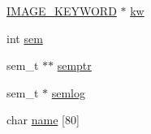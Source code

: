 \begin{DoxyCompactItemize}
\begin{tabbing}
\end{tabbing}\item 
\hyperlink{structIMAGE__KEYWORD}{I\+M\+A\+G\+E\+\_\+\+K\+E\+Y\+W\+O\+R\+D} $\ast$ \hyperlink{structIMAGE_aeec1ba7287c93dc589e38c4b1479b967}{kw}
\item 
int \hyperlink{structIMAGE_a6a50020081f8e319972497690237fb66}{sem}
\item 
sem\+\_\+t $\ast$$\ast$ \hyperlink{structIMAGE_a85b29e7531f0e07a5f68dbea97a14477}{semptr}
\item 
sem\+\_\+t $\ast$ \hyperlink{structIMAGE_a9862b2c9defbf6a47a982da827048ed1}{semlog}
\item 
char \hyperlink{structIMAGE_ab141d7fe6a4c6c197f0200599f69b1f7}{name} \mbox{[}80\mbox{]}
\end{DoxyCompactItemize}


